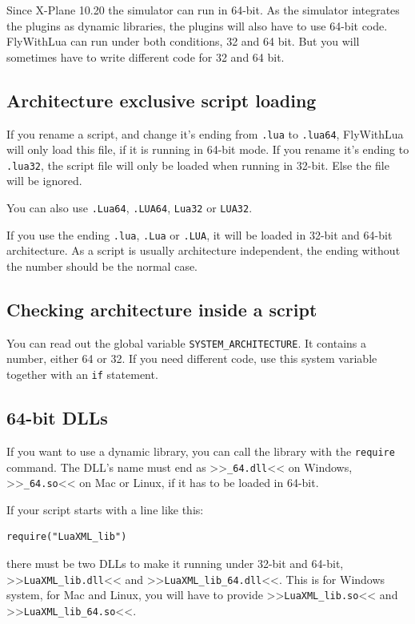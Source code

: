 \documentclass[11pt,parskip=half,a4paper]{scrartcl}
\begin{document}
Since X-Plane 10.20 the simulator can run in 64-bit. As the simulator integrates the plugins as dynamic libraries, the plugins will also have to use 64-bit code. FlyWithLua can run under both conditions, 32 and 64 bit. But you will sometimes have to write different code for 32 and 64 bit.

\subsection{Architecture exclusive script loading}

If you rename a script, and change it's ending from \verb|.lua| to \verb|.lua64|, FlyWithLua will only load this file, if it is running in 64-bit mode. If you rename it's ending to \verb|.lua32|, the script file will only be loaded when running in 32-bit. Else the file will be ignored.

You can also use \verb|.Lua64|, \verb|.LUA64|, \verb|Lua32| or \verb|LUA32|.

If you use the ending \verb|.lua|, \verb|.Lua| or \verb|.LUA|, it will be loaded in 32-bit and 64-bit architecture. As a script is usually architecture independent, the ending without the number should be the normal case.

\subsection{Checking architecture inside a script}

You can read out the global variable \verb|SYSTEM_ARCHITECTURE|. It contains a number, either 64 or 32. If you need different code, use this system variable together with an \verb|if| statement.

\subsection{64-bit DLLs}

If you want to use a dynamic library, you can call the library with the \verb|require| command. The DLL's name must end as >>\verb|_64.dll|<< on Windows, >>\verb|_64.so|<< on Mac or Linux, if it has to be loaded in 64-bit.

If your script starts with a line like this:

\begin{lstlisting}[firstnumber=1]
require("LuaXML_lib")
\end{lstlisting}

there must be two DLLs to make it running under 32-bit and 64-bit, >>\verb|LuaXML_lib.dll|<< and >>\verb|LuaXML_lib_64.dll|<<. This is for Windows system, for Mac and Linux, you will have to provide >>\verb|LuaXML_lib.so|<< and >>\verb|LuaXML_lib_64.so|<<.
\end{document}
